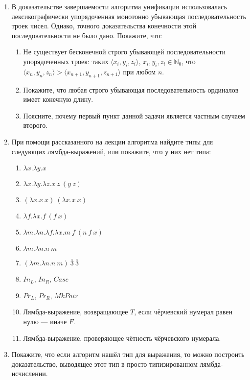 \documentclass[10pt,a4paper,oneside]{article}
\begin{document}
\begin{enumerate}
\begin{enumerate}
\end{enumerate}

\item В доказательстве завершаемости алгоритма унификации использовалась лексикографически
упорядоченная монотонно убывающая последовательность троек чисел. Однако, точного доказательства
конечности этой последовательности не было дано. Покажите, что:

\begin{enumerate}
\item Не существует бесконечной строго убывающей последовательности упорядоченных троек:
таких $\langle x_i, y_i, z_i\rangle$, $x_i,y_i,z_i \in\mathbb{N}_0$, что
$\langle x_n, y_n, z_n\rangle > \langle x_{n+1}, y_{n+1}, z_{n+1} \rangle$ при любом $n$.
\item Покажите, что любая строго убывающая последовательность ординалов имеет конечную длину.
\item Поясните, почему первый пункт данной задачи является частным случаем второго.
\end{enumerate}

\item При помощи рассказанного на лекции алгоритма найдите типы для следующих лямбда-выражений, или покажите,
что у них нет типа:
\begin{enumerate}
\item $\lambda x.\lambda y.x$
\item $\lambda x.\lambda y.\lambda z.x\ z\ (y\ z)$
\item $(\lambda x.x\ x)\ (\lambda x.x\ x)$
\item $\lambda f.\lambda x.f\ (f\ x)$
\item $\lambda m.\lambda n.\lambda f.\lambda x.m\ f\ (n\ f\ x)$
\item $\lambda m.\lambda n.n\ m$
\item $(\lambda m.\lambda n.n\ m)\ \overline{3}\ \overline{3}$
\item $In_L$, $In_R$, $Case$
\item $Pr_L$, $Pr_R$, $MkPair$
\item Лямбда-выражение, возвращающее $T$, если чёрчевский нумерал равен нулю --- иначе $F$.
\item Лямбда-выражение, проверяющее чётность чёрчевского нумерала.
\end{enumerate}

\item Покажите, что если алгоритм нашёл тип для выражения, то можно построить доказательство,
выводящее этот тип в просто типизированном лямбда-исчислении.


\end{enumerate}
\end{document}
